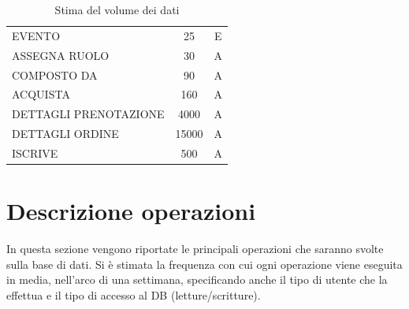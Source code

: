\documentclass[a4paper,12pt]{report}
\begin{document}
\begin{table}[H]
\begin{tabularx}{\textwidth}{|X|c|c|}
		EVENTO                & 25                      & E            \\
		ASSEGNA RUOLO         & 30                      & A            \\
		COMPOSTO DA           & 90                      & A            \\
		ACQUISTA              & 160                     & A            \\
		DETTAGLI PRENOTAZIONE & 4000                    & A            \\
		DETTAGLI ORDINE       & 15000                   & A            \\
		ISCRIVE               & 500                     & A            \\
		\hline
	\end{tabularx}
	\caption{Stima del volume dei dati}
\end{table}

\section{Descrizione operazioni}
In questa sezione vengono riportate le principali operazioni che saranno svolte sulla base di dati.
Si è stimata la frequenza con cui ogni operazione viene eseguita in media, nell'arco di una settimana,
specificando anche il tipo di utente che la effettua e il tipo di accesso al DB (letture/scritture).
\end{document}
